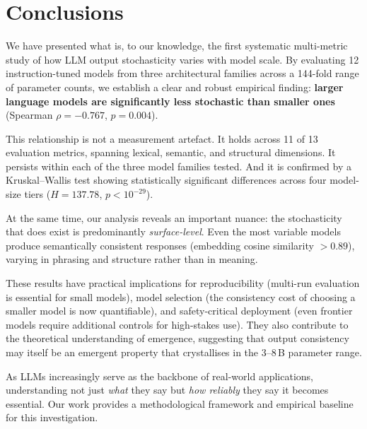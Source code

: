 \documentclass[11pt,a4paper]{article}
\begin{document}
\section{Conclusions}
\label{sec:conclusion}

We have presented what is, to our knowledge, the first systematic multi-metric study of how LLM output stochasticity varies with model scale.
By evaluating 12 instruction-tuned models from three architectural families across a 144-fold range of parameter counts, we establish a clear and robust empirical finding: \textbf{larger language models are significantly less stochastic than smaller ones} (Spearman $\rho = -0.767$, $p = 0.004$).

This relationship is not a measurement artefact.
It holds across 11 of 13 evaluation metrics, spanning lexical, semantic, and structural dimensions.
It persists within each of the three model families tested.
And it is confirmed by a Kruskal--Wallis test showing statistically significant differences across four model-size tiers ($H = 137.78$, $p < 10^{-29}$).

At the same time, our analysis reveals an important nuance: the stochasticity that does exist is predominantly \emph{surface-level}.
Even the most variable models produce semantically consistent responses (embedding cosine similarity $> 0.89$), varying in phrasing and structure rather than in meaning.

These results have practical implications for reproducibility (multi-run evaluation is essential for small models), model selection (the consistency cost of choosing a smaller model is now quantifiable), and safety-critical deployment (even frontier models require additional controls for high-stakes use).
They also contribute to the theoretical understanding of emergence, suggesting that output consistency may itself be an emergent property that crystallises in the 3--8\,B parameter range.

As LLMs increasingly serve as the backbone of real-world applications, understanding not just \emph{what} they say but \emph{how reliably} they say it becomes essential.
Our work provides a methodological framework and empirical baseline for this investigation.

\end{document}

